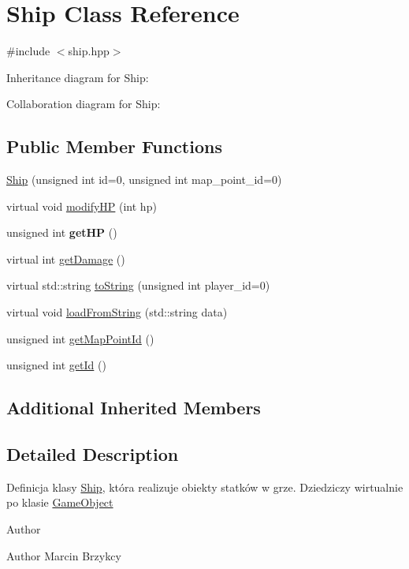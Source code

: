 \hypertarget{classShip}{}\section{Ship Class Reference}
\label{classShip}


{\ttfamily \#include $<$ship.\+hpp$>$}



Inheritance diagram for Ship\+:


Collaboration diagram for Ship\+:
\subsection*{Public Member Functions}
\begin{DoxyCompactItemize}
\item 
\hyperlink{classShip_a53a29a2b25670010054f1213418fa0c3}{Ship} (unsigned int id=0, unsigned int map\+\_\+point\+\_\+id=0)
\item 
virtual void \hyperlink{classShip_af692fb5ca42305b33e0610b9ddfa86ae}{modify\+HP} (int hp)
\item 
unsigned int {\bfseries get\+HP} ()\hypertarget{classShip_ac8672fb8aa4d7d4062133fda00acae3e}{}\label{classShip_ac8672fb8aa4d7d4062133fda00acae3e}

\item 
virtual int \hyperlink{classShip_a3dc79be9726b79f233dd39e12e42cd9c}{get\+Damage} ()
\item 
virtual std\+::string \hyperlink{classShip_ad743a4cd0710f1cae47440d8c5ef1df2}{to\+String} (unsigned int player\+\_\+id=0)
\item 
virtual void \hyperlink{classShip_a5bc993a110736454a5da0afbce0adcf8}{load\+From\+String} (std\+::string data)
\item 
unsigned int \hyperlink{classShip_afc0dda3e395f0f900d76bebc205beda0}{get\+Map\+Point\+Id} ()
\item 
unsigned int \hyperlink{classShip_a069f10228cdfb90c8e2fca03d69ffe07}{get\+Id} ()
\end{DoxyCompactItemize}
\subsection*{Additional Inherited Members}


\subsection{Detailed Description}
Definicja klasy \hyperlink{classShip}{Ship}, która realizuje obiekty statków w grze. Dziedziczy wirtualnie po klasie \hyperlink{classGameObject}{Game\+Object} \begin{DoxyAuthor}{Author}

\end{DoxyAuthor}
\begin{DoxyParagraph}{Author}
Marcin Brzykcy 
\end{DoxyParagraph}


